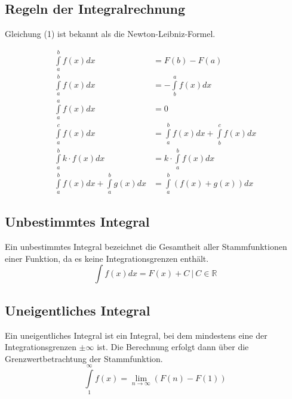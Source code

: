 \subsection{Regeln der Integralrechnung}
Gleichung (1) ist bekannt als die Newton-Leibniz-Formel.

\begin{align}
  \int\limits_a^b f(x) dx &= F(b)-F(a) \\
  \int\limits_a^b f(x) dx &= -\int\limits_b^a f(x) dx \\
  \int\limits_a^a f(x) dx &= 0 \\
  \int\limits_a^c f(x) dx
    &= \int\limits_a^b f(x) dx + \int\limits_b^c f(x) dx \\
  \int\limits_a^b k \cdot f(x) dx
    &= k \cdot \int\limits_a^b f(x) dx\\
  \int\limits_a^b f(x) dx + \int\limits_a^b g(x) dx
    &= \int\limits_a^b (f(x) + g(x)) dx
\end{align}


\subsection{Unbestimmtes Integral}
Ein unbestimmtes Integral bezeichnet die Gesamtheit aller Stammfunktionen einer
Funktion, da es keine Integrationsgrenzen enthält.
\begin{equation}
  \int f(x) dx = F(x) + C ~|~ C\in \mathbb{R}
\end{equation}

\subsection{Uneigentliches Integral}
Ein uneigentliches Integral ist ein Integral, bei dem mindestens eine der
Integrationsgrenzen $\pm\infty$ ist. Die Berechnung erfolgt dann über die
Grenzwertbetrachtung der Stammfunktion.
\begin{equation}
  \int\limits_1^\infty f(x) = \lim\limits_{n \rightarrow \infty}(F(n) - F(1))
\end{equation}
